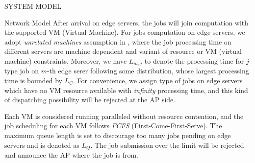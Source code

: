 \documentclass[10pt, conference, letterpaper]{IEEEtran}
\begin{document}
\begin{section}{SYSTEM MODEL}
\begin{subsection}{Network Model}
            After arrival on edge servers, the jobs will join computation with the supported VM (Virtual Machine).
            For jobs computation on edge servers, we adopt \emph{unrelated machines} assumption in \cite{tan-online}, where the job processing time on different servers are machine dependent and variant of resource or VM (virtual machine) constraints.
            Moreover, we have $L_{m,j}$ to denote the processing time for $j$-type job on $m$-th edge serer following some distribution, whose largest processing time is bounded by $L_C$.
            For convenience, we assign type of jobs on edge servers which have no VM resource available with \emph{infinity} processing time, and this kind of dispatching possibility will be rejected at the AP side.

            Each VM is considered running paralleled without resource contention, and the job scheduling for each VM follows \emph{FCFS} (First-Come-First-Serve).
            {\color{red}The maximum queue length is set to discourage too many jobs pending on edge servers and is denoted as $L_Q$. The job submission over the limit will be rejected and announce the AP where the job is from.}
        \end{subsection}


\end{section}
\end{document}
